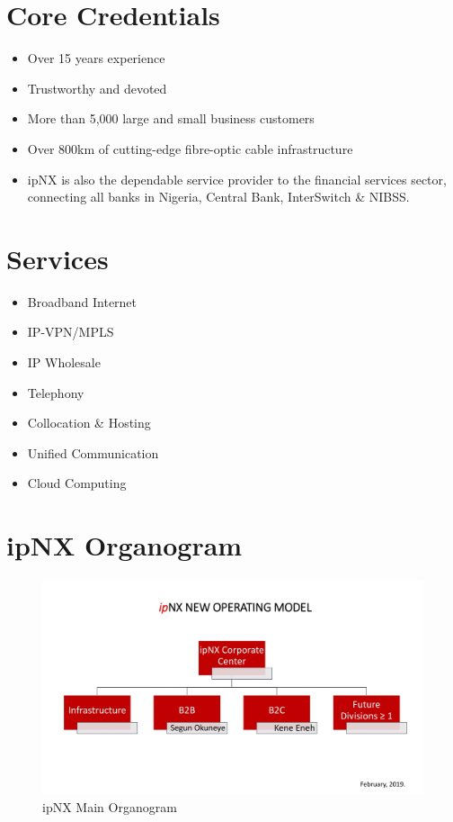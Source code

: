 \section{Core Credentials}
\begin{itemize}
	\item[] Over 15 years experience
	\item[] Trustworthy and devoted
	\item[] More than 5,000 large and small business customers
	\item[] Over 800km of cutting-edge fibre-optic cable infrastructure
	\item[] ipNX is also the dependable service provider to the financial services sector, connecting all banks in Nigeria, Central Bank, InterSwitch \& NIBSS.
\end{itemize}
\section{Services}
\begin{itemize}
	\item[] Broadband Internet
	\item[] IP-VPN/MPLS
	\item[] IP Wholesale
	\item[] Telephony
	\item[] Collocation \& Hosting
	\item[] Unified Communication
	\item[] Cloud Computing
\end{itemize}
\section{ipNX Organogram}
\begin{figure}[h]
	\centering
	\includegraphics[width=1\textwidth]{./mainorg}
	\caption{ipNX Main Organogram}
\end{figure}

